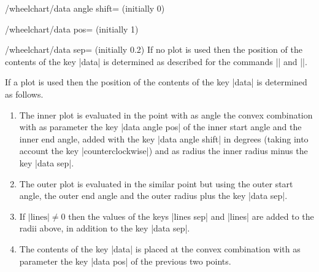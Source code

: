 \documentclass[a4paper,english,dvipsnames]{ltxdoc}
\begin{document}
\begin{key}{/wheelchart/data angle shift= (initially 0)}
\end{key}
\begin{key}{/wheelchart/data pos= (initially 1)}
\end{key}
\begin{key}{/wheelchart/data sep= (initially 0.2)}
If no plot is used then the position of the contents of the key |data| is determined as described for the commands |\WCangle| and |\WCradius|.

If a plot is used then the position of the contents of the key |data| is determined as follows.
\begin{enumerate}
\item The inner plot is evaluated in the point with as angle the convex combination with as parameter the key |data angle pos| of the inner start angle and the inner end angle, added with the key |data angle shift| in degrees (taking into account the key |counterclockwise|) and as radius the inner radius minus the key |data sep|.
\item The outer plot is evaluated in the similar point but using the outer start angle, the outer end angle and the outer radius plus the key |data sep|.
\item If $\text{|lines|}\neq 0$ then the values of the keys |lines sep| and |lines| are added to the radii above, in addition to the key |data sep|.
\item The contents of the key |data| is placed at the convex combination with as parameter the key |data pos| of the previous two points.
\end{enumerate}
\begin{codeexample}[]
\begin{tikzpicture}
\wheelchart[
  data angle pos{2}=0.3,
  data angle pos{6}=0.8,
  data angle shift{3}=-0.1,
  data angle shift{5}=0.1,
  data pos=\WClistB,
  data sep=0,
  lines{1,2,4,6,7}=0.5,
  lines{3,5}=1,
  lines angle pos{1}=0.8,
  lines angle shift{7}=-0.2,
  lines ext=\WClistA,
  lines ext dir{1,...,3}=left,
  lines ext dir{4,...,7}=right,
  lines ext fixed,
  lines ext fixed left=-1,
  lines ext fixed right=7,
  lines pos=\WClistB,
  lines sep=0.2*\WClistA,
  xbar={6}{1.5},
  WClistA={1,0},
  WClistB={0,1},
  wheel data=\WCperc,
  wheel data pos=0.5,
  wheel data pos{1}=1,
  wheel data pos{4}=0,
  wheel data sep=0.2
]{\exampleforthismanual}
\end{tikzpicture}
\end{codeexample}
\end{key}
\end{document}
